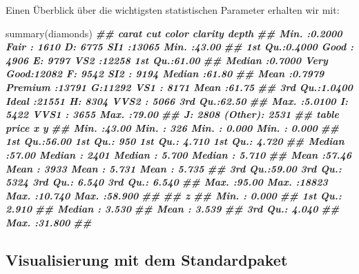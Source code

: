 \documentclass[
  ngerman,
]{article}
\newenvironment{Shaded}{\begin{snugshade}}{\end{snugshade}}
\newcommand{\DocumentationTok}[1]{\textcolor[rgb]{0.56,0.35,0.01}{\textbf{\textit{#1}}}}
\newcommand{\FunctionTok}[1]{\textcolor[rgb]{0.00,0.00,0.00}{#1}}
\newcommand{\NormalTok}[1]{#1}
\begin{document}
Einen Überblick über die wichtigsten statistischen Parameter erhalten wir mit:

\begin{Shaded}
\begin{Highlighting}[]
\FunctionTok{summary}\NormalTok{(diamonds)}
\DocumentationTok{\#\#      carat               cut        color        clarity          depth      }
\DocumentationTok{\#\#  Min.   :0.2000   Fair     : 1610   D: 6775   SI1    :13065   Min.   :43.00  }
\DocumentationTok{\#\#  1st Qu.:0.4000   Good     : 4906   E: 9797   VS2    :12258   1st Qu.:61.00  }
\DocumentationTok{\#\#  Median :0.7000   Very Good:12082   F: 9542   SI2    : 9194   Median :61.80  }
\DocumentationTok{\#\#  Mean   :0.7979   Premium  :13791   G:11292   VS1    : 8171   Mean   :61.75  }
\DocumentationTok{\#\#  3rd Qu.:1.0400   Ideal    :21551   H: 8304   VVS2   : 5066   3rd Qu.:62.50  }
\DocumentationTok{\#\#  Max.   :5.0100                     I: 5422   VVS1   : 3655   Max.   :79.00  }
\DocumentationTok{\#\#                                     J: 2808   (Other): 2531                  }
\DocumentationTok{\#\#      table           price             x                y         }
\DocumentationTok{\#\#  Min.   :43.00   Min.   :  326   Min.   : 0.000   Min.   : 0.000  }
\DocumentationTok{\#\#  1st Qu.:56.00   1st Qu.:  950   1st Qu.: 4.710   1st Qu.: 4.720  }
\DocumentationTok{\#\#  Median :57.00   Median : 2401   Median : 5.700   Median : 5.710  }
\DocumentationTok{\#\#  Mean   :57.46   Mean   : 3933   Mean   : 5.731   Mean   : 5.735  }
\DocumentationTok{\#\#  3rd Qu.:59.00   3rd Qu.: 5324   3rd Qu.: 6.540   3rd Qu.: 6.540  }
\DocumentationTok{\#\#  Max.   :95.00   Max.   :18823   Max.   :10.740   Max.   :58.900  }
\DocumentationTok{\#\#                                                                   }
\DocumentationTok{\#\#        z         }
\DocumentationTok{\#\#  Min.   : 0.000  }
\DocumentationTok{\#\#  1st Qu.: 2.910  }
\DocumentationTok{\#\#  Median : 3.530  }
\DocumentationTok{\#\#  Mean   : 3.539  }
\DocumentationTok{\#\#  3rd Qu.: 4.040  }
\DocumentationTok{\#\#  Max.   :31.800  }
\DocumentationTok{\#\# }
\end{Highlighting}
\end{Shaded}

\hypertarget{visualisierung-mit-dem-standardpaket}{%
\subsection{Visualisierung mit dem Standardpaket}\label{visualisierung-mit-dem-standardpaket}}
\end{document}
